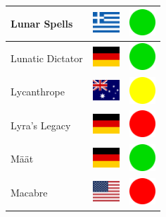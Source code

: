 \documentclass[12pt, a4paper, twoside]{report}
\begin{document}
\begin{center}
\begin{longtable}{|p{5cm}|p{2cm}|p{2cm}|}
 Lunar Spells                                               & \includegraphics[width=1cm]{../img/flags/gr} &   \includegraphics[width=1cm]{../likes/y} \\ \hline
 Lunatic Dictator                                           & \includegraphics[width=1cm]{../img/flags/de} &   \includegraphics[width=1cm]{../likes/y} \\ \hline
 Lycanthrope                                                & \includegraphics[width=1cm]{../img/flags/au} &   \includegraphics[width=1cm]{../likes/m} \\ \hline
 Lyra's Legacy                                              & \includegraphics[width=1cm]{../img/flags/de} &   \includegraphics[width=1cm]{../likes/n} \\ \hline
 Määt                                                       & \includegraphics[width=1cm]{../img/flags/de} &   \includegraphics[width=1cm]{../likes/y} \\ \hline
 Macabre                                                    & \includegraphics[width=1cm]{../img/flags/us} &   \includegraphics[width=1cm]{../likes/n} \\ \hline

\end{longtable}
\end{center}
\end{document}
